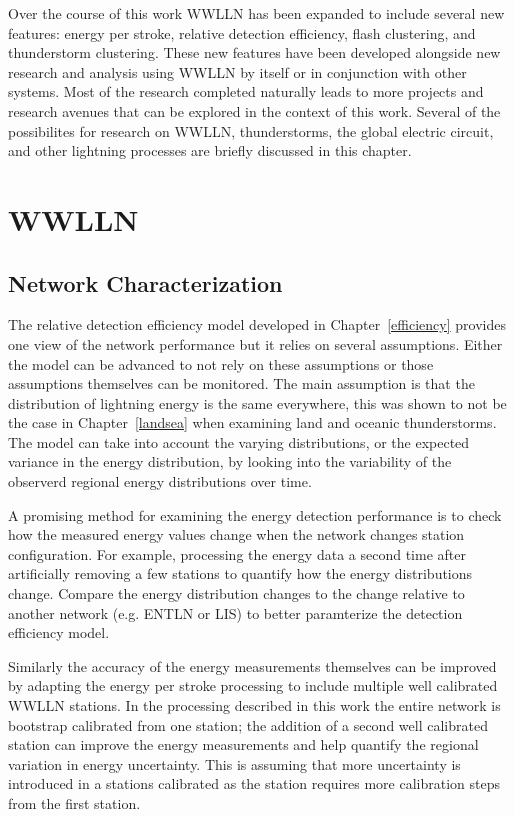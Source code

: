 Over the course of this work WWLLN has been expanded to include several new features: energy per stroke, relative detection efficiency, flash clustering, and thunderstorm clustering.
These new features have been developed alongside new research and analysis using WWLLN by itself or in conjunction with other systems.
Most of the research completed naturally leads to more projects and research avenues that can be explored in the context of this work.
Several of the possibilites for research on WWLLN, thunderstorms, the global electric circuit, and other lightning processes are briefly discussed in this chapter.

\section{WWLLN}

\subsection{Network Characterization}

The relative detection efficiency model developed in Chapter~\ref{efficiency} provides one view of the network performance but it relies on several assumptions.
Either the model can be advanced to not rely on these assumptions or those assumptions themselves can be monitored.
The main assumption is that the distribution of lightning energy is the same everywhere, this was shown to not be the case in Chapter~\ref{landsea} when examining land and oceanic thunderstorms.
The model can take into account the varying distributions, or the expected variance in the energy distribution, by looking into the variability of the observerd regional energy distributions over time.

A promising method for examining the energy detection performance is to check how the measured energy values change when the network changes station configuration.
For example, processing the energy data a second time after artificially removing a few stations to quantify how the energy distributions change.
Compare the energy distribution changes to the change relative to another network (e.g. ENTLN or LIS) to better paramterize the detection efficiency model.

Similarly the accuracy of the energy measurements themselves can be improved by adapting the energy per stroke processing to include multiple well calibrated WWLLN stations.
In the processing described in this work the entire network is bootstrap calibrated from one station; the addition of a second well calibrated station can improve the energy measurements and help quantify the regional variation in energy uncertainty.
This is assuming that more uncertainty is introduced in a stations calibrated as the station requires more calibration steps from the first station.

